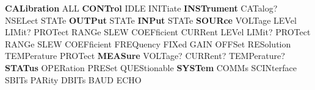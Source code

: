 \begin{DoxyPre}
{\bfseries CALibration}
    ALL
{\bfseries CONTrol}
    IDLE
        INITiate
{\bfseries INSTrument}
    CATalog?
    NSELect
    STATe
{\bfseries OUTPut}
    STATe
{\bfseries INPut}
    STATe
{\bfseries SOURce}
    VOLTage
        LEVel
        LIMit?
        PROTect
        RANGe
        SLEW
        COEFficient
    CURRent
        LEVel
        LIMit?
        PROTect
        RANGe
        SLEW
        COEFficient
    FREQuency
        FIXed
        GAIN
        OFFSet
        RESolution
    TEMPerature
        PROTect
{\bfseries MEASure}
    VOLTage?
    CURRent?
    TEMPerature?
{\bfseries STATus}
    OPERation
    PRESet
    QUEStionable
{\bfseries SYSTem}
    COMMs
        SCINterface
            SBITs
            PARity
            DBITs
            BAUD
            ECHO
\end{DoxyPre}
 